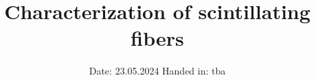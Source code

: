 

\subject{LAB REPORT}
\title{Characterization of scintillating fibers}
\date{%
  Date: 23.05.2024
  \hspace{3em}
  Handed in: tba
}



\maketitle
\thispagestyle{empty}
\tableofcontents
\newpage






\printbibliography{}



